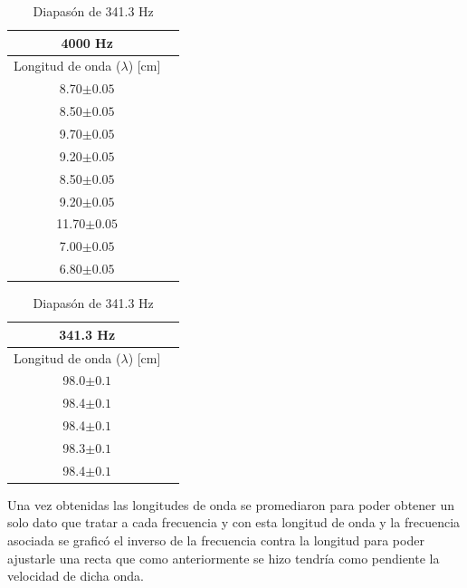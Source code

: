 \documentclass[10pt,a4paper]{article}
\begin{document}
\begin{table}[H]
    \centering
\begin{minipage}[t]{0.48\linewidth}\centering
\caption{Diapasón de 4000 Hz}
\begin{tabular}{ c c }
\toprule
4000 Hz   \\
\midrule
Longitud de onda ($\lambda$) [cm]     \\
8.70$\pm0.05$     \\
8.50$\pm0.05$     \\
9.70$\pm0.05$     \\
9.20$\pm0.05$     \\
8.50$\pm0.05$     \\
9.20$\pm0.05$     \\
11.70$\pm0.05$     \\
7.00$\pm0.05$     \\
6.80$\pm0.05$     \\
\bottomrule
\end{tabular}
\end{minipage}\hfill%
\begin{minipage}[t]{0.48\linewidth}\centering
\caption{Diapasón de 341.3 Hz}
\label{tab:The parameters 2 }
\begin{tabular}{ c c }
\toprule
341.3 Hz \\
\midrule
Longitud de onda ($\lambda$) [cm]     \\
98.0$\pm0.1$     \\
98.4$\pm0.1$     \\
98.4$\pm0.1$     \\
98.3$\pm0.1$     \\
98.4$\pm0.1$     \\
\bottomrule
\end{tabular}
\end{minipage}
\end{table}
 
Una vez obtenidas las longitudes de onda se promediaron para poder obtener un solo dato que tratar a cada frecuencia y con esta longitud de onda y la frecuencia asociada se graficó el inverso de la frecuencia contra la longitud para poder ajustarle una recta que como anteriormente se hizo tendría como pendiente la velocidad de dicha onda. 
\end{document}
